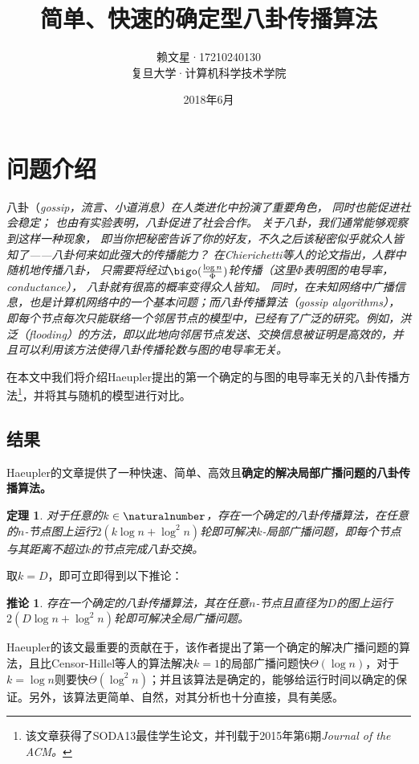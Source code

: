 \documentclass[12pt]{article}
\title{简单、快速的确定型八卦传播算法}
\date{2018年6月}
\author{赖文星·17210240130\\ 复旦大学·计算机科学技术学院}
\newtheorem{theorem}{定理}[section]
\newtheorem{corollary}{推论}[theorem]
\begin{document}
\maketitle
\section{问题介绍}
八卦（\it{gossip}，流言、小道消息）在人类进化中扮演了重要角色，
同时也能促进社会稳定\cite{DunbarGossipevolutionaryperspective2004}；
也由有实验表明，八卦促进了社会合作\cite{Feinbergvirtuesgossipreputational2012}。
关于八卦，我们通常能够观察到这样一种现象，
即当你把秘密告诉了你的好友，不久之后该秘密似乎就众人皆知了——八卦何来如此强大的传播能力？
在Chierichetti等人的论文指出，人群中随机地传播八卦，
只需要将经过$\bigo(\frac{\log n}{\Phi})$轮传播（这里$\Phi$表明图的电导率，\it{conductance}），
八卦就有很高的概率变得众人皆知\cite{ChierichettiRumorSpreadingConductance2018}。
同时，在未知网络中\it{广播}信息，也是计算机网络中的一个基本问题；而八卦传播算法（\it{gossip algorithms}），即每个节点每次只能联络一个邻居节点的模型中，已经有了广泛的研究。例如，洪泛（\it{flooding}）的方法，即以此地向邻居节点发送、交换信息被证明是高效的，并且可以利用该方法使得八卦传播轮数与图的电导率无关\cite{Censor-HillelGlobalComputationPoorly2012}。

在本文中我们将介绍Haeupler提出的第一个确定的与图的电导率无关的八卦传播方法\footnote{该文章获得了SODA13最佳学生论文，并刊载于2015年第6期\it{Journal of the ACM}。}\cite{HaeuplerSimpleFastDeterministic2015}，并将其与随机的\pullpush 模型进行对比。
\subsection{结果}
Haeupler的文章提供了一种快速、简单、高效且\bf{确定}的解决局部广播问题的八卦传播算法。
\begin{theorem}
  对于任意的$k\in \naturalnumber$，存在一个确定的八卦传播算法，在任意的$n$-节点图上运行$2(k\log n + \log^2 n)$轮即可解决$k$-局部广播问题，即每个节点与其距离不超过$k$的节点完成八卦交换。
\end{theorem}
取$k=D$，即可立即得到以下推论：
\begin{corollary}
  存在一个确定的八卦传播算法，其在任意$n$-节点且直径为$D$的图上运行$2(D\log n + \log^2 n)$轮即可解决全局广播问题。
\end{corollary}

Haeupler的该文最重要的贡献在于，该作者提出了第一个确定的解决广播问题的算法，且比Censor-Hillel等人的算法解决$k=1$的局部广播问题快$\Theta(\log n)$，对于$k=\log n$则要快$\Theta(\log^2 n)$；并且该算法是确定的，能够给运行时间以确定的保证。另外，该算法更简单、自然，对其分析也十分直接，具有美感。
\end{document}
